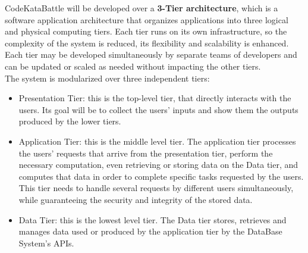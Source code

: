 CodeKataBattle will be developed over a \textbf{3-Tier architecture}, which is a software application architecture that organizes applications into three logical and physical computing tiers. Each tier runs on its own infrastructure, so the complexity of the system is reduced, its flexibility and scalability is enhanced. Each tier may be developed simultaneously by separate teams of developers and can be updated or scaled as needed without impacting the other tiers.
\\
The system is modularized over three independent tiers:
\begin{itemize}
    \item Presentation Tier: this is the top-level tier, that directly interacts with the users. Its goal will be to collect the users’ inputs and show them the outputs produced by the lower tiers. 
    \item Application Tier: this is the middle level tier. The application tier processes the users’ requests that arrive from the presentation tier, perform the necessary computation, even retrieving or storing data on the Data tier, and computes that data in order to complete specific tasks requested by the users. This tier needs to handle several requests by different users simultaneously, while guaranteeing the security and integrity of the stored data.
    \item Data Tier: this is the lowest level tier. The Data tier stores, retrieves and manages data used or produced by the application tier by the DataBase System’s APIs.
\end{itemize}

